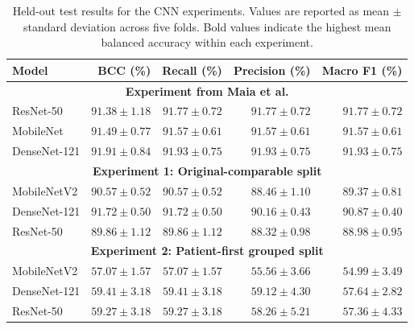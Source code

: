 \begin{table}[t]
\caption{Held-out test results for the CNN experiments. Values are reported as mean $\pm$ standard deviation across five folds. Bold values indicate the highest mean balanced accuracy within each experiment.}
\label{tab:cnn-experiment-results}
\centering
\small
\begin{tabular}{@{}lrrrr@{}}
\toprule
Model & BCC (\%) & Recall (\%) & Precision (\%) & Macro F1 (\%) \\
\midrule
\multicolumn{5}{c}{\textbf{Experiment from Maia et al. \citep{MAIA2024122418}}} \\
\midrule
ResNet-50 & $91.38 \pm 1.18$ & $91.77 \pm 0.72$ & $91.77 \pm 0.72$ & $91.77 \pm 0.72$ \\
MobileNet & $91.49 \pm 0.77$ & $91.57 \pm 0.61$ & $91.57 \pm 0.61$ & $91.57 \pm 0.61$ \\
DenseNet-121 & $\mathbf{91.91 \pm 0.84}$ & $91.93 \pm 0.75$ & $91.93 \pm 0.75$ & $91.93 \pm 0.75$ \\
\midrule
\multicolumn{5}{c}{\textbf{Experiment 1: Original-comparable split}} \\
\midrule
MobileNetV2 & $90.57 \pm 0.52$ & $90.57 \pm 0.52$ & $88.46 \pm 1.10$ & $89.37 \pm 0.81$ \\
DenseNet-121 & $\mathbf{91.72 \pm 0.50}$ & $91.72 \pm 0.50$ & $90.16 \pm 0.43$ & $90.87 \pm 0.40$ \\
ResNet-50 & $89.86 \pm 1.12$ & $89.86 \pm 1.12$ & $88.32 \pm 0.98$ & $88.98 \pm 0.95$ \\
\midrule
\multicolumn{5}{c}{\textbf{Experiment 2: Patient-first grouped split}} \\
\midrule
MobileNetV2 & $57.07 \pm 1.57$ & $57.07 \pm 1.57$ & $55.56 \pm 3.66$ & $54.99 \pm 3.49$ \\
DenseNet-121 & $\mathbf{59.41 \pm 3.18}$ & $59.41 \pm 3.18$ & $59.12 \pm 4.30$ & $57.64 \pm 2.82$ \\
ResNet-50 & $59.27 \pm 3.18$ & $59.27 \pm 3.18$ & $58.26 \pm 5.21$ & $57.36 \pm 4.33$ \\
\bottomrule
\end{tabular}
\end{table}

